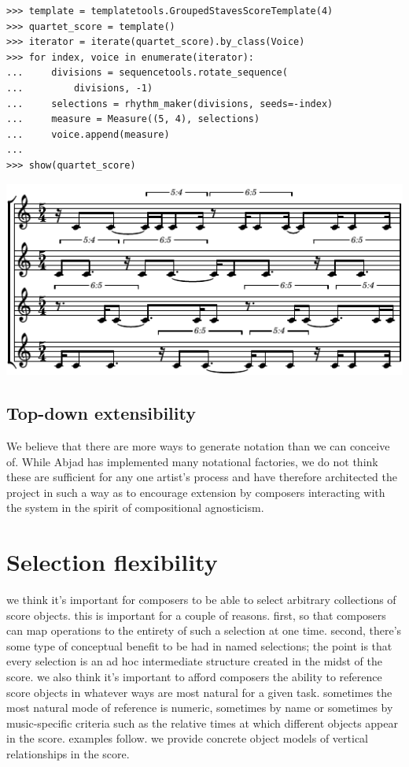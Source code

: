 \documentclass{article}
\begin{document}
\begin{lstlisting}
>>> template = templatetools.GroupedStavesScoreTemplate(4)
>>> quartet_score = template()
>>> iterator = iterate(quartet_score).by_class(Voice)
>>> for index, voice in enumerate(iterator):
...     divisions = sequencetools.rotate_sequence(
...         divisions, -1)
...     selections = rhythm_maker(divisions, seeds=-index)
...     measure = Measure((5, 4), selections)
...     voice.append(measure)
... 
>>> show(quartet_score)
\end{lstlisting}

\noindent\includegraphics[scale=1.0]{images/abjad-6.pdf}


\subsection{Top-down extensibility}

We believe that there are more ways to generate notation than we can conceive
of. While Abjad has implemented many notational factories, we do not think
these are sufficient for any one artist's process and have therefore
architected the project in such a way as to encourage extension by composers
interacting with the system in the spirit of compositional agnosticism.


\section{Selection flexibility} \label{sec:selections}

we think it's important for composers to be able to select arbitrary
collections of score objects. this is important for a couple of reasons. first,
so that composers can map operations to the entirety of such a selection at one
time. second, there's some type of conceptual benefit to be had in named
selections; the point is that every selection is an ad hoc intermediate
structure created in the midst of the score. we also think it's important to
afford composers the ability to reference score objects in whatever ways are
most natural for a given task. sometimes the most natural mode of reference is
numeric, sometimes by name or sometimes by music-specific criteria such as the
relative times at which different objects appear in the score. examples follow.
we provide concrete object models of vertical relationships in the score.
\end{document}
